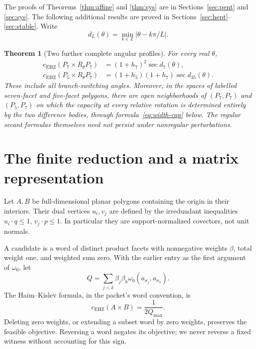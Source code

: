 \documentclass[11pt,a4paper]{article}
\newtheorem{theorem}{Theorem}[section]
\theoremstyle{definition}\newtheorem{definition}[theorem]{Definition}
\theoremstyle{remark}\newtheorem{remark}[theorem]{Remark}
\newcommand{\capc}{c_{\mathrm{EHZ}}}
\begin{document}
The proofs of Theorems~\ref{thm:affine} and \ref{thm:sys} are in Sections~\ref{sec:pent} and \ref{sec:sys}. The following additional results are proved in Sections~\ref{sec:hept}--\ref{sec:stable}. Write
\[
 d_L(\theta)=\min_{k\in\mathbb Z}|\theta-k\pi/L|.
\]
\begin{theorem}[Two further complete angular profiles]\label{thm:hept-main}
For every real $\theta$,
\begin{align}
 \capc(P_7\times R_\theta P_7)&=(1+h_7)^2\sec d_7(\theta),\label{eq:77}\\
 \capc(P_5\times R_\theta P_7)&=(1+h_5)(1+h_7)\sec d_{35}(\theta).\label{eq:57}
\end{align}
These include all branch-switching angles. Moreover, in the spaces of labelled seven-facet and five-facet polygons, there are open neighborhoods of $(P_7,P_7)$ and $(P_5,P_7)$ on which the capacity at every relative rotation is determined entirely by the two difference bodies, through formula~\eqref{eq:width-cap} below. The regular secant formulas themselves need not persist under nonregular perturbations.
\end{theorem}

\section{The finite reduction and a matrix representation}\label{sec:reduction}
Let $A,B$ be full-dimensional planar polygons containing the origin in their interiors. Their dual vertices $u_i,v_j$ are defined by the irredundant inequalities $u_i\cdot q\le1$, $v_j\cdot p\le1$. In particular they are support-normalized covectors, not unit normals.

A candidate is a word of distinct product facets with nonnegative weights $\beta$, total weight one, and weighted sum zero. With the earlier entry as the first argument of $\omega_0$, let
\[
 Q=\sum_{j<k}\beta_j\beta_k\omega_0(a_{\sigma_j},a_{\sigma_k}).
\]
The Haim--Kislev formula, in the packet's word convention, is \cite[Theorem 1.1]{HK}
\begin{equation}\label{eq:HK}
 \capc(A\times B)=\frac1{2Q_{\max}}.
\end{equation}
Deleting zero weights, or extending a subset word by zero weights, preserves the feasible objective. Reversing a word negates its objective; we never reverse a fixed witness without accounting for this sign.
\end{document}

